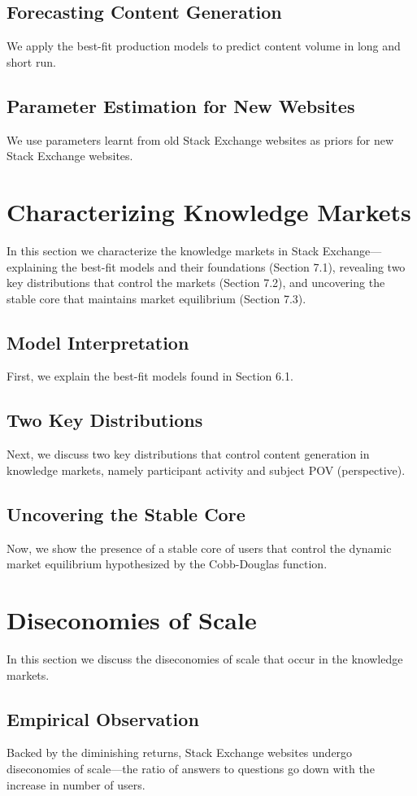 \documentclass[sigconf]{acmart}
\begin{document}
\subsection{Forecasting Content Generation}
We apply the best-fit production models to predict content volume in long and short run.
\subsection{Parameter Estimation for New Websites}
We use parameters learnt from old Stack Exchange websites as priors for new Stack Exchange websites.

\section{Characterizing Knowledge Markets}
In this section we characterize the knowledge markets in Stack Exchange---explaining the best-fit models and their foundations (Section 7.1), revealing two key distributions that control the markets (Section 7.2), and uncovering the stable core that maintains market equilibrium (Section 7.3).
\subsection{Model Interpretation}
First, we explain the best-fit models found in Section 6.1.
\subsection{Two Key Distributions}
Next, we discuss two key distributions that control content generation in knowledge markets, namely participant activity and subject POV (perspective).
\subsection{Uncovering the Stable Core}
Now, we show the presence of a stable core of users that control the dynamic market equilibrium hypothesized by the Cobb-Douglas function.

\section{Diseconomies of Scale}
In this section we discuss the diseconomies of scale that occur in the knowledge markets.
\subsection{Empirical Observation}
Backed by the diminishing returns, Stack Exchange websites undergo diseconomies of scale---the ratio of answers to questions go down with the increase in number of users.
\end{document}
